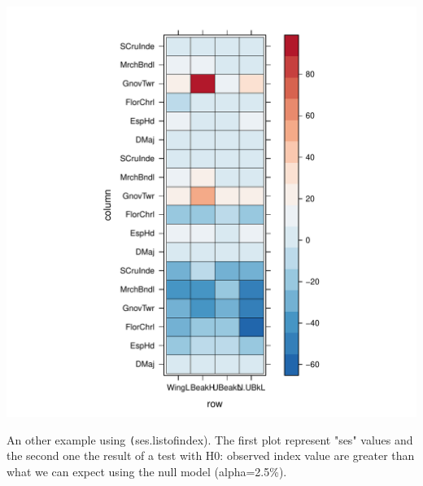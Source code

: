 \documentclass[12pt]{article}\usepackage[]{graphicx}\usepackage[]{color}
\makeatletter
\def\maxwidth{ %
  \ifdim\Gin@nat@width>\linewidth
    \linewidth
  \else
    \Gin@nat@width
  \fi
}
\newenvironment{kframe}{%
 \def\at@end@of@kframe{}%
 \ifinner\ifhmode%
  \def\at@end@of@kframe{\end{minipage}}%
  \begin{minipage}{\columnwidth}%
 \fi\fi%
 \def\FrameCommand##1{\hskip\@totalleftmargin \hskip-\fboxsep
 \colorbox{shadecolor}{##1}\hskip-\fboxsep
     \hskip-\linewidth \hskip-\@totalleftmargin \hskip\columnwidth}%
 \MakeFramed {\advance\hsize-\width
   \@totalleftmargin\z@ \linewidth\hsize
   \@setminipage}}%
 {\par\unskip\endMakeFramed%
 \at@end@of@kframe}
\newenvironment{knitrout}{}{} %
\newcommand{\code}[1]{{{\tt #1}}}
\makeatother
\begin{document}
\begin{knitrout}
\begin{kframe}
\begin{alltt}
\end{alltt}
\end{kframe}
\includegraphics[width=\maxwidth]{figure/unnamed-chunk-432} 

\end{knitrout}


An other example using \code(ses.listofindex). The first plot represent "ses" values and the second one the result of a test with H0: observed index value are greater than what we can expect using the null model (alpha=2.5\%).
\end{document}
